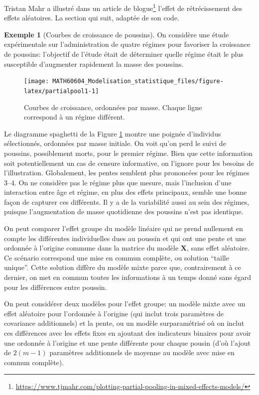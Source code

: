 \documentclass[
  11pt,
  letterpaper,
]{article}
\renewcommand{\href}[2]{#2\footnote{\url{#1}}}
\theoremstyle{definition}
\theoremstyle{definition}
\newtheorem{example}{Exemple}[section]
\theoremstyle{definition}
\theoremstyle{definition}
\theoremstyle{remark}
\begin{document}
\href{https://www.tjmahr.com/plotting-partial-pooling-in-mixed-effects-models/}{Tristan Mahr a illustré dans un article de blogue} l'effet de rétrécissement des effets aléatoires. La section qui suit, adaptée de son code.

\begin{example}[Courbes de croissance de poussins]
\protect\hypertarget{exm:chickcurve}{}\label{exm:chickcurve}On considère une étude expérimentale sur l'administration de quatre régimes pour favoriser la croissance de poussins: l'objectif de l'étude était de déterminer quelle régime était le plus susceptible d'augmenter rapidement la masse des poussins.
\end{example}

\begin{figure}

{\centering \texttt{[image: MATH60604\_Modelisation\_statistique\_files/figure-latex/partialpool1-1]} 

}

\caption{Courbes de croissance, ordonnées par masse. Chaque ligne correspond à un régime différent.}\label{fig:partialpool1}
\end{figure}

Le diagramme spaghetti de la Figure \ref{fig:partialpool1} montre une poignée d'individus sélectionnés, ordonnées par masse initiale. On voit qu'on perd le suivi de poussins, possiblement morts, pour le premier régime. Bien que cette information soit potentiellement un cas de censure informative, on l'ignore pour les besoins de l'illustration. Globalement, les pentes semblent plus prononcées pour les régimes 3--4. On ne considère pas le régime plus que mesure, mais l'inclusion d'une interaction entre âge et régime, en plus des effets principaux, semble une bonne façon de capturer ces différents. Il y a de la variabilité aussi au sein des régimes, puisque l'augmentation de masse quotidienne des poussins n'est pas identique.

On peut comparer l'effet groupe du modèle linéaire qui ne prend nullement en compte les différentes individuelles dues au poussin et qui ont une pente et une ordonnée à l'origine commune dans la matrice du modèle \(\mathbf{X}\), sans effet aléatoire. Ce scénario correspond une mise en commun complète, ou solution ``taille unique''. Cette solution diffère du modèle mixte parce que, contrairement à ce dernier, on met en commun toutes les informations à un temps donné sans égard pour les différences entre poussin.

On peut considérer deux modèles pour l'effet groupe: un modèle mixte avec un effet aléatoire pour l'ordonnée à l'origine (qui inclut trois paramètres de covariance additionnels) et la pente, ou un modèle surparamétrisé où on inclut ces différences avec les effets fixes en ajoutant des indicateurs binaires pour avoir une ordonnée à l'origine et une pente différente pour chaque pousin (d'où l'ajout de \(2(m-1)\) paramètres additionnels de moyenne au modèle avec mise en commun complète).
\end{document}
